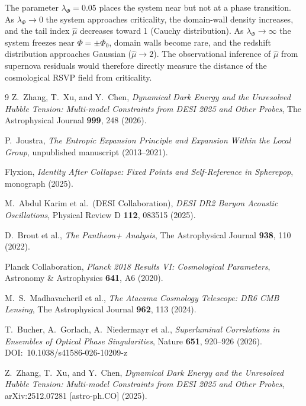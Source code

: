 \documentclass[12pt,a4paper]{article}
\theoremstyle{remark}
\begin{document}
The parameter $\lambda_\Phi = 0.05$ places the system near but not at a
phase transition. As $\lambda_\Phi \to 0$ the system approaches criticality,
the domain-wall density increases, and the tail index $\hat{\mu}$ decreases
toward 1 (Cauchy distribution). As $\lambda_\Phi \to \infty$ the system
freezes near $\Phi = \pm\Phi_0$, domain walls become rare, and the redshift
distribution approaches Gaussian ($\hat{\mu} \to 2$). The observational
inference of $\hat{\mu}$ from supernova residuals would therefore directly
measure the distance of the cosmological RSVP field from criticality.



\begin{thebibliography}{9}
Z.\ Zhang, T.\ Xu, and Y.\ Chen,
\textit{Dynamical Dark Energy and the Unresolved Hubble Tension: Multi-model Constraints from DESI 2025 and Other Probes},
The Astrophysical Journal \textbf{999}, 248 (2026).

P.\ Joustra,
\textit{The Entropic Expansion Principle and Expansion Within the Local Group},
unpublished manuscript (2013--2021).

Flyxion,
\textit{Identity After Collapse: Fixed Points and Self-Reference in Spherepop},
monograph (2025).

M.\ Abdul Karim et al.\ (DESI Collaboration),
\textit{DESI DR2 Baryon Acoustic Oscillations},
Physical Review D \textbf{112}, 083515 (2025).

D.\ Brout et al.,
\textit{The Pantheon+ Analysis},
The Astrophysical Journal \textbf{938}, 110 (2022).

Planck Collaboration,
\textit{Planck 2018 Results VI: Cosmological Parameters},
Astronomy \& Astrophysics \textbf{641}, A6 (2020).

M.\ S.\ Madhavacheril et al.,
\textit{The Atacama Cosmology Telescope: DR6 CMB Lensing},
The Astrophysical Journal \textbf{962}, 113 (2024).

T.\ Bucher, A.\ Gorlach, A.\ Niedermayr et al.,
\textit{Superluminal Correlations in Ensembles of Optical Phase Singularities},
Nature \textbf{651}, 920--926 (2026).
DOI:~10.1038/s41586-026-10209-z

Z.\ Zhang, T.\ Xu, and Y.\ Chen,
\textit{Dynamical Dark Energy and the Unresolved Hubble Tension: Multi-model Constraints from DESI 2025 and Other Probes},
arXiv:2512.07281 [astro-ph.CO] (2025).
\end{thebibliography}
\end{document}
